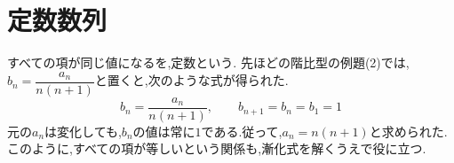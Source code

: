 
\section{定数数列}\label{節：おまけ：定数数列}
  すべての項が同じ値になるを,定数という.
  先ほどの階比型の例題(2)では,$b_n=\dfrac{a_n}{n(n+1)}$と置くと,次のような式が得られた.
  \[
    b_n=\frac{a_n}{n(n+1)},\qquad b_{n+1}=b_n=b_1=1
  \]
  元の$a_n$は変化しても,$b_n$の値は常に$1$である.従って,$a_n=n(n+1)$と求められた.
  このように,すべての項が等しいという関係も,漸化式を解くうえで役に立つ.
